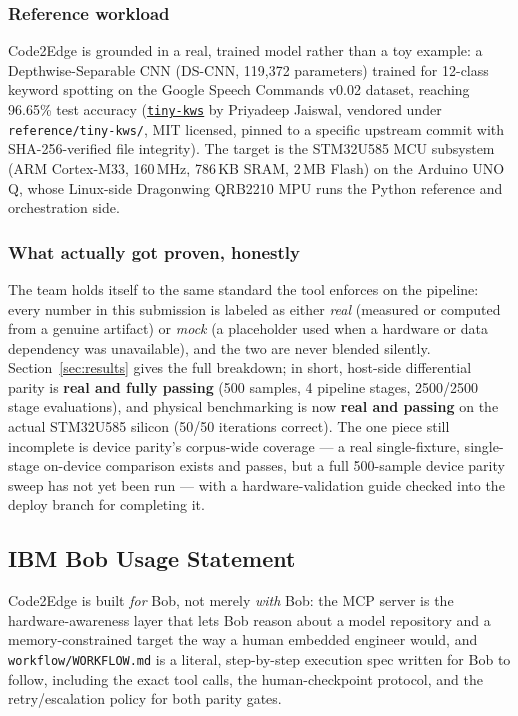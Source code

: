 \documentclass[11pt,a4paper]{article}
\begin{document}
\subsubsection{Reference workload}
Code2Edge is grounded in a real, trained model rather than a toy example:
a Depthwise-Separable CNN (DS-CNN, 119{,}372 parameters) trained for
12-class keyword spotting on the Google Speech Commands v0.02 dataset,
reaching 96.65\% test accuracy (\href{https://github.com/priyadeepjaiswal9c/tiny-kws}{\texttt{tiny-kws}}
by Priyadeep Jaiswal, vendored under \texttt{reference/tiny-kws/}, MIT
licensed, pinned to a specific upstream commit with SHA-256-verified file
integrity). The target is the STM32U585 MCU subsystem (ARM Cortex-M33,
160\,MHz, 786\,KB SRAM, 2\,MB Flash) on the Arduino UNO Q, whose Linux-side
Dragonwing QRB2210 MPU runs the Python reference and orchestration side.

\subsubsection{What actually got proven, honestly}
The team holds itself to the same standard the tool enforces on the
pipeline: every number in this submission is labeled as either \emph{real}
(measured or computed from a genuine artifact) or \emph{mock} (a
placeholder used when a hardware or data dependency was unavailable), and
the two are never blended silently. Section~\ref{sec:results} gives the
full breakdown; in short, host-side differential parity is \textbf{real
and fully passing} (500 samples, 4 pipeline stages, 2500/2500 stage
evaluations), and physical benchmarking is now \textbf{real and passing}
on the actual STM32U585 silicon (50/50 iterations correct). The one piece
still incomplete is device parity's corpus-wide coverage --- a real
single-fixture, single-stage on-device comparison exists and passes, but
a full 500-sample device parity sweep has not yet been run --- with a
hardware-validation guide checked into the deploy branch for completing
it.

\subsection{IBM Bob Usage Statement}
\begin{infobox}
Code2Edge is built \emph{for} Bob, not merely \emph{with} Bob: the MCP
server is the hardware-awareness layer that lets Bob reason about a
model repository and a memory-constrained target the way a human embedded
engineer would, and \texttt{workflow/WORKFLOW.md} is a literal,
step-by-step execution spec written for Bob to follow, including the exact
tool calls, the human-checkpoint protocol, and the retry/escalation policy
for both parity gates.
\end{infobox}
\end{document}
